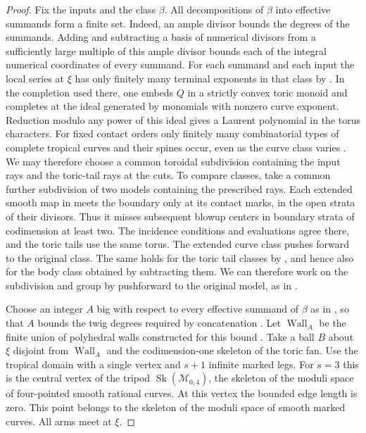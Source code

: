 \documentclass[11pt,reqno]{amsart}
\numberwithin{equation}{section}
\theoremstyle{definition}
\theoremstyle{remark}
\begin{document}
\begin{proof}
Fix the inputs and the class \(\beta\). All decompositions of \(\beta\)
into effective summands form a finite set. Indeed, an ample divisor bounds
the degrees of the summands. Adding and subtracting a basis of numerical
divisors from a sufficiently large multiple of this ample divisor bounds
each of the integral numerical coordinates of every summand. For each
summand and each input the local series at \(\xi\) has only finitely many
terminal exponents in that class by \cite[Proposition~20.21]{KY}.
In the completion used there, one embeds \(Q\) in a strictly convex
toric monoid and completes at the ideal generated by monomials with
nonzero curve exponent. Reduction modulo any power of this ideal gives a
Laurent polynomial in the torus characters. For fixed contact orders only finitely many
combinatorial types of complete tropical curves and their spines
occur, even as the curve class varies \cite[Lemma~4.29]{KY}.
We may therefore choose a common toroidal subdivision containing the
input rays and the toric-tail rays at the cuts.
To compare classes, take a common further subdivision of two models
containing the prescribed rays. Each extended smooth map in
\cite[Construction~9.3]{KY} meets the boundary only at its contact
marks, in the open strata of their divisors. Thus it misses subsequent
blowup centers in boundary strata of codimension at least two. The
incidence conditions and evaluations agree there, and the toric tails
use the same torus. The extended curve class pushes forward to the
original class. The same holds for the toric tail classes by
\cite[Definition~7.9 and Proposition~7.11]{KY}, and hence also for
the body class obtained by subtracting them. We can therefore work
on the subdivision and group by pushforward to the original model,
as in \cite[Definition~1.1 and Proposition~17.3(1)]{KY}.

Choose an integer \(A\) big with respect to every effective summand
of \(\beta\) as in \cite[Definition~4.28]{KY}, so that \(A\) bounds
the twig degrees required by concatenation \cite[Theorem~12.4]{KY}.
Let \(\operatorname{Wall}_A\) be the finite union of polyhedral walls
constructed for this bound \cite[Constructions~4.15--4.16]{KY}. Take a ball \(B\)
about \(\xi\) disjoint from
\(\operatorname{Wall}_A\) and the codimension-one skeleton of the toric fan.
Use the tropical domain with a single vertex and \(s+1\) infinite marked
legs. For \(s=3\) this is the central vertex of the tripod
\(\operatorname{Sk}(\mathcal M_{0,4})\), the skeleton of the moduli
space of four-pointed smooth rational curves. At this vertex the bounded edge
length is zero. This point belongs to the skeleton of the moduli space of smooth
marked curves. All arms meet at \(\xi\).


\end{proof}
\end{document}
